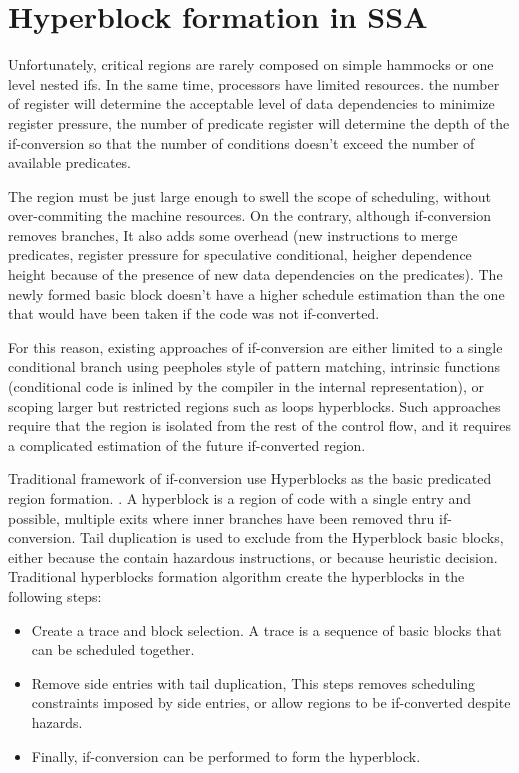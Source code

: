 \section{Hyperblock formation in SSA}

Unfortunately, critical regions are rarely composed on simple hammocks or one level nested ifs. In the same time, processors have limited resources. the number of register will determine the acceptable level of data dependencies to minimize register pressure, the number of predicate register will determine the depth of the if-conversion so that the number of conditions doesn't exceed the number of available predicates. 

The region must be just large enough to swell the scope of scheduling, without over-commiting the machine resources. On the contrary, although if-conversion removes branches, It also adds some overhead (new instructions to merge predicates, register pressure for speculative conditional, heigher dependence height because of the presence of new data dependencies on the predicates). The newly formed basic block doesn't have a higher schedule estimation than the one that would have been taken if the code was not if-converted.

For this reason, existing approaches of if-conversion are either limited to a single conditional branch using peepholes style of pattern matching, intrinsic functions (conditional code is inlined by the compiler in the internal representation), or scoping larger but restricted regions such as loops hyperblocks. Such approaches require that the region is isolated from the rest of the control flow, and it requires a complicated estimation of the future if-converted region.

Traditional framework of if-conversion use Hyperblocks as the basic predicated region formation. \cite{Mahlke:1992:ECS:144965.144998}. A hyperblock is a region of code with a single entry and possible, multiple exits where inner branches have been removed thru if-conversion. Tail duplication is used to exclude from the Hyperblock basic blocks, either because the contain hazardous instructions, or because heuristic decision. 
Traditional hyperblocks formation algorithm create the hyperblocks in the following steps:
\begin{itemize}
\item Create a trace and block selection. A trace is a sequence of basic blocks that can be scheduled together. 
\item Remove side entries with tail duplication, This steps removes scheduling constraints imposed by side entries, or allow regions to be if-converted despite hazards.
\item Finally, if-conversion can be performed to form the hyperblock. 
\end{itemize}

